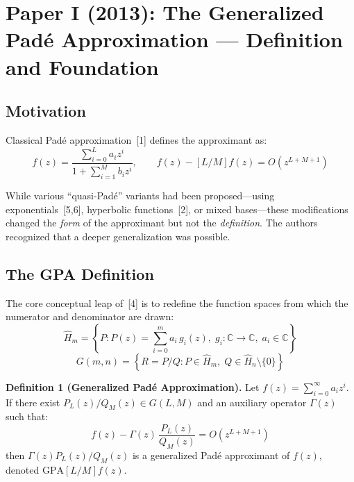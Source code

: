 \documentclass[11pt,a4paper]{article}
\begin{document}
\section{Paper I (2013): The Generalized Pad\'e Approximation --- Definition and Foundation}

\subsection{Motivation}

Classical Pad\'e approximation~[1] defines the approximant as:
\begin{equation}
[L/M]f(z) = \frac{\sum_{i=0}^{L} a_i z^i}{1 + \sum_{i=1}^{M} b_i z^i}, \qquad f(z) - [L/M]f(z) = O(z^{L+M+1})
\label{eq:classical_pade}
\end{equation}

While various ``quasi-Pad\'e'' variants had been proposed---using exponentials~[5,6], hyperbolic functions~[2], or mixed bases---these modifications changed the \emph{form} of the approximant but not the \emph{definition}. The authors recognized that a deeper generalization was possible.

\subsection{The GPA Definition}

The core conceptual leap of~[4] is to redefine the function spaces from which the numerator and denominator are drawn:
\begin{equation}
\hat{H}_m = \left\{ P : P(z) = \sum_{i=0}^{m} a_i \, g_i(z), \; g_i: \mathbb{C} \to \mathbb{C}, \; a_i \in \mathbb{C} \right\}
\label{eq:H_hat}
\end{equation}
\begin{equation}
G(m,n) = \left\{ R = P/Q : P \in \hat{H}_m, \; Q \in \hat{H}_n \setminus \{0\} \right\}
\label{eq:G_space}
\end{equation}

\textbf{Definition 1 (Generalized Pad\'e Approximation).} Let $f(z) = \sum_{i=0}^{\infty} a_i z^i$. If there exist $P_L(z)/Q_M(z) \in G(L,M)$ and an auxiliary operator $\Gamma(z)$ such that:
\begin{equation}
\boxed{f(z) - \Gamma(z)\,\frac{P_L(z)}{Q_M(z)} = O(z^{L+M+1})}
\label{eq:gpa_def}
\end{equation}
then $\Gamma(z) P_L(z)/Q_M(z)$ is a generalized Pad\'e approximant of $f(z)$, denoted $\text{GPA}[L/M]f(z)$.
\end{document}
